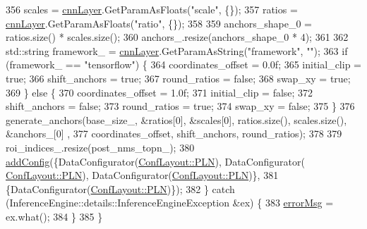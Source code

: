 \begin{DoxyCode}
356             scales = \hyperlink{classInferenceEngine_1_1Extensions_1_1Cpu_1_1ExtLayerBase_a1074cdccacb9e9ca6eec01bbc2f7ca4a}{cnnLayer}.GetParamAsFloats(\textcolor{stringliteral}{"scale"}, \{\});
357             ratios = \hyperlink{classInferenceEngine_1_1Extensions_1_1Cpu_1_1ExtLayerBase_a1074cdccacb9e9ca6eec01bbc2f7ca4a}{cnnLayer}.GetParamAsFloats(\textcolor{stringliteral}{"ratio"}, \{\});
358 
359             anchors\_shape\_0 = ratios.size() * scales.size();
360             anchors\_.resize(anchors\_shape\_0 * 4);
361 
362             std::string framework\_ = \hyperlink{classInferenceEngine_1_1Extensions_1_1Cpu_1_1ExtLayerBase_a1074cdccacb9e9ca6eec01bbc2f7ca4a}{cnnLayer}.GetParamAsString(\textcolor{stringliteral}{"framework"}, \textcolor{stringliteral}{""});
363             \textcolor{keywordflow}{if} (framework\_ == \textcolor{stringliteral}{"tensorflow"}) \{
364                 coordinates\_offset = 0.0f;
365                 initial\_clip = \textcolor{keyword}{true};
366                 shift\_anchors = \textcolor{keyword}{true};
367                 round\_ratios = \textcolor{keyword}{false};
368                 swap\_xy = \textcolor{keyword}{true};
369             \} \textcolor{keywordflow}{else} \{
370                 coordinates\_offset = 1.0f;
371                 initial\_clip = \textcolor{keyword}{false};
372                 shift\_anchors = \textcolor{keyword}{false};
373                 round\_ratios = \textcolor{keyword}{true};
374                 swap\_xy = \textcolor{keyword}{false};
375             \}
376             generate\_anchors(base\_size\_, &ratios[0], &scales[0], ratios.size(), scales.size(), &anchors\_[0]
      ,
377                              coordinates\_offset, shift\_anchors, round\_ratios);
378 
379             roi\_indices\_.resize(post\_nms\_topn\_);
380             \hyperlink{classInferenceEngine_1_1Extensions_1_1Cpu_1_1ExtLayerBase_a0ac7a6632e95b9500d5246b05b4b0bfa}{addConfig}(\{DataConfigurator(\hyperlink{classInferenceEngine_1_1Extensions_1_1Cpu_1_1ExtLayerBase_a1258a8d209e0249e0b1717618352ddfba446687ea2db1ada75be5ed053be77f59}{ConfLayout::PLN}), DataConfigurator(
      \hyperlink{classInferenceEngine_1_1Extensions_1_1Cpu_1_1ExtLayerBase_a1258a8d209e0249e0b1717618352ddfba446687ea2db1ada75be5ed053be77f59}{ConfLayout::PLN}), DataConfigurator(\hyperlink{classInferenceEngine_1_1Extensions_1_1Cpu_1_1ExtLayerBase_a1258a8d209e0249e0b1717618352ddfba446687ea2db1ada75be5ed053be77f59}{ConfLayout::PLN})\},
381                       \{DataConfigurator(\hyperlink{classInferenceEngine_1_1Extensions_1_1Cpu_1_1ExtLayerBase_a1258a8d209e0249e0b1717618352ddfba446687ea2db1ada75be5ed053be77f59}{ConfLayout::PLN})\});
382         \} \textcolor{keywordflow}{catch} (InferenceEngine::details::InferenceEngineException &ex) \{
383             \hyperlink{classInferenceEngine_1_1Extensions_1_1Cpu_1_1ExtLayerBase_abc78e9b5a79fa339ffd831a5318f71f7}{errorMsg} = ex.what();
384         \}
385     \}
\end{DoxyCode}


